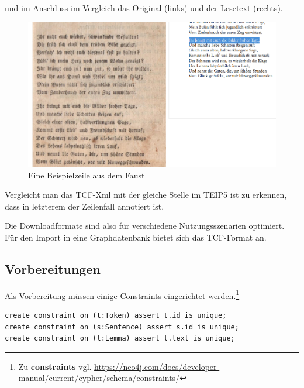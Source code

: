 und im Anschluss im Vergleich das Original (links) und der Lesetext
(rechts).

\begin{figure}
\centering
\includegraphics{Bilder/Faust-S11-Faks.png}
\caption{Eine Beispielzeile aus dem Faust}
\end{figure}

Vergleicht man das TCF-Xml mit der gleiche Stelle im TEIP5 ist zu
erkennen, dass in letzterem der Zeilenfall annotiert ist.

\begin{Shaded}
\begin{Highlighting}[]
  \KeywordTok{>}
\end{Highlighting}
\end{Shaded}

Die Downloadformate sind also für verschiedene Nutzungsszenarien
optimiert. Für den Import in eine Graphdatenbank bietet sich das
TCF-Format an.

\hypertarget{vorbereitungen}{%
\subsection{Vorbereitungen}\label{vorbereitungen}}

Als Vorbereitung müssen einige Constraints eingerichtet
werden.\footnote{Zu \textbf{constraints} vgl.
  \url{https://neo4j.com/docs/developer-manual/current/cypher/schema/constraints/}}

\begin{verbatim}
create constraint on (t:Token) assert t.id is unique;
create constraint on (s:Sentence) assert s.id is unique;
create constraint on (l:Lemma) assert l.text is unique;
\end{verbatim}

